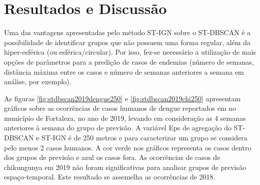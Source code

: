 \section{Resultados e Discussão}
\label{sec:discussao}
Uma das vantagens apresentadas pelo método ST-IGN sobre o ST-DBSCAN é a possibilidade de identificar grupos que não possuem uma forma regular, além da hiper-esférica (ou esférica/circular). Por isso, fez-se necessário a utilização de mais opções de parâmetros para a predição de casos de endemias (número de semanas, distância máxima entre os casos e número de semanas anteriores a semana em análise, por exemplo).



As figuras \ref{fig:stdbscan2019dengue250} e \ref{fig:stdbscan2019chi250} apresentam gráficos sobre as ocorrências de casos humanos de dengue reportados em \cite{simda} no município de Fortaleza, no ano de 2019, levando em consideração as 4 semanas anteriores à semana do grupo de previsão. A variável Eps de agregação do ST-DBSCAN e ST-IGN é de 250 metros e para caracterizar um grupo se considera pelo menos 2 casos humanos. A cor verde nos gráficos representa os casos dentro dos grupos de previsão e azul os casos fora. As ocorrências de casos de chikungunya em 2019 não foram significativas para analisar grupos de previsão espaço-temporal. Este resultado se assemelha as ocorrências de 2018.

\begin{figure}[!ht]
	\centering	
\end{figure}
\FloatBarrier

\begin{figure}[!ht]
	\centering	
\end{figure}
\FloatBarrier

